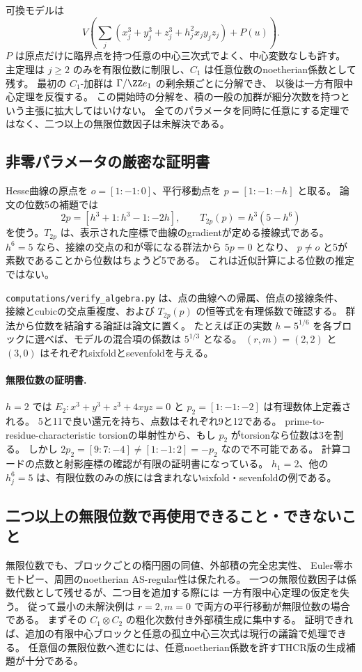 可換モデルは
\[
 V\!\left(\sum_j(x_j^3+y_j^3+z_j^3+h_j^2x_jy_jz_j)+P(u)\right).
\]
\(P\) は原点だけに臨界点を持つ任意の中心三次式でよく、中心変数なしも許す。
主定理は \(j\ge2\) のみを有限位数に制限し、\(C_1\) は任意位数のnoetherian係数として残す。
最初の \(C_1\)-加群は \(\Gamma/\ZZ e_1\) の剰余類ごとに分解でき、
以後は一方有限中心定理を反復する。
この開始時の分解を、積の一般の加群が細分次数を持つという主張に拡大してはいけない。
全てのパラメータを同時に任意にする定理ではなく、二つ以上の無限位数因子は未解決である。

\subsection{非零パラメータの厳密な証明書}

Hesse曲線の原点を \(o=[1:-1:0]\)、平行移動点を \(p=[1:-1:-h]\) と取る。
論文の位数5の補題では
\[
 2p=[h^3+1:h^3-1:-2h],\qquad
 T_{2p}(p)=h^3(5-h^6)
\]
を使う。\(T_{2p}\) は、表示された座標で曲線のgradientが定める接線式である。
\(h^6=5\) なら、接線の交点の和が零になる群法から \(5p=0\) となり、
\(p\ne o\) と5が素数であることから位数はちょうど5である。
これは近似計算による位数の推定ではない。

\texttt{computations/verify\_algebra.py} は、点の曲線への帰属、倍点の接線条件、
接線とcubicの交点重複度、および \(T_{2p}(p)\) の恒等式を有理係数で確認する。
群法から位数を結論する論証は論文に置く。
たとえば正の実数 \(h=5^{1/6}\) を各ブロックに選べば、モデルの混合項の係数は \(5^{1/3}\) となる。
\((r,m)=(2,2)\) と \((3,0)\) はそれぞれsixfoldとsevenfoldを与える。

\paragraph{無限位数の証明書.}
\(h=2\) では \(E_2:x^3+y^3+z^3+4xyz=0\) と \(p_2=[1:-1:-2]\) は有理数体上定義される。
5と11で良い還元を持ち、点数はそれぞれ9と12である。
prime-to-residue-characteristic torsionの単射性から、もし \(p_2\) がtorsionなら位数は3を割る。
しかし \(2p_2=[9:7:-4]\ne[1:-1:2]=-p_2\) なので不可能である。
計算コードの点数と射影座標の確認が有限の証明書になっている。
\(h_1=2\)、他の \(h_j^6=5\) は、有限位数のみの族には含まれないsixfold・sevenfoldの例である。

\subsection{二つ以上の無限位数で再使用できること・できないこと}

無限位数でも、ブロックごとの楕円圏の同値、外部積の完全忠実性、
Euler零ホモトピー、周囲のnoetherian AS-regular性は保たれる。
一つの無限位数因子は係数代数として残せるが、二つ目を追加する際には
一方有限中心定理の仮定を失う。
従って最小の未解決例は \(r=2,m=0\) で両方の平行移動が無限位数の場合である。
まずその \(C_1\otimes C_2\) の粗化次数付き外部積生成に集中する。
証明できれば、追加の有限中心ブロックと任意の孤立中心三次式は現行の議論で処理できる。
任意個の無限位数へ進むには、任意noetherian係数を許すTHCR版の生成補題が十分である。

